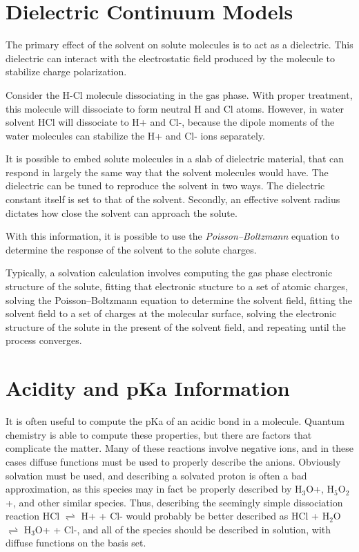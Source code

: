 \section{Dielectric Continuum Models}
The primary effect of the solvent on solute molecules is to act as a
dielectric. This dielectric can interact with the electrostatic field
produced by the molecule to stabilize charge polarization. 

Consider the H-Cl molecule dissociating in the gas phase. With proper
treatment, this molecule will dissociate to form neutral H and Cl
atoms. However, in water solvent HCl will dissociate to
H+ and Cl-, because the dipole moments of the water molecules can
stabilize the H+ and Cl- ions separately.

It is possible to embed solute molecules in a slab of dielectric
material, that can respond in largely the same way that the solvent
molecules would have. The dielectric can be tuned to reproduce the
solvent in two ways. The dielectric constant itself is set to that of
the solvent. Secondly, an effective solvent radius dictates how close
the solvent can approach the solute.

With this information, it is possible to use the
\emph{Poisson--Boltzmann} equation to determine the response of the
solvent to the solute charges.

Typically, a solvation calculation involves computing the gas phase
electronic structure of the solute, fitting that electronic stucture
to a set of atomic charges, solving the Poisson--Boltzmann equation to
determine the solvent field, fitting the solvent field to a set of
charges at the molecular surface, solving the electronic structure of
the solute in the present of the solvent field, and repeating until
the process converges.



\section{Acidity and pKa Information}
It is often useful to compute the pKa of an acidic bond in
a molecule. Quantum chemistry is able to compute these properties, but
there are factors that complicate the matter. Many of these
reactions involve negative ions, and in these cases diffuse functions
must be used to properly describe the anions. Obviously solvation must
be used, and describing a solvated proton is often a bad
approximation, as this species may in fact be properly described by
H$_3$O+, H$_5$O$_2$+, and other similar species. Thus, describing the
seemingly simple dissociation reaction HCl $\rightleftharpoons$ H+ +
Cl- would probably be better described as HCl + H$_2$O
$\rightleftharpoons$ H$_3$O+ + Cl-, and all of the species should be
described in solution, with diffuse functions on the basis set.

